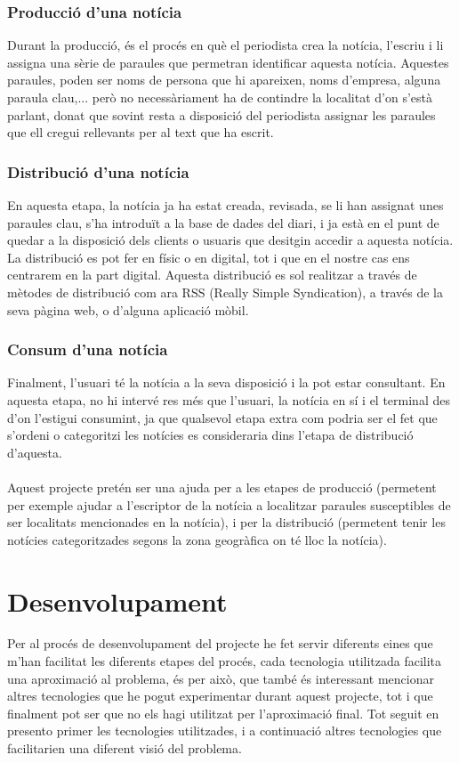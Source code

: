 \documentclass[12pt,a4paper,openright,oneside]{article}
\numberwithin{equation}{section}
\theoremstyle{definition}
\begin{document}
\subsubsection*{Producció d'una notícia}
Durant la producció, és el procés en què el periodista crea la notícia, l'escriu i li assigna una sèrie de paraules que permetran identificar aquesta notícia. Aquestes paraules, poden ser noms de persona que hi apareixen, noms d'empresa, alguna paraula clau,... però no necessàriament ha de contindre la localitat d'on s'està parlant, donat que sovint resta a disposició del periodista assignar les paraules que ell cregui rellevants per al text que ha escrit.\\
\subsubsection*{Distribució d'una notícia}
En aquesta etapa, la notícia ja ha estat creada, revisada, se li han assignat unes paraules clau, s'ha introduït a la base de dades del diari, i ja està en el punt de quedar a la disposició dels clients o usuaris que desitgin accedir a aquesta notícia. La distribució es pot fer en físic o en digital, tot i que en el nostre cas ens centrarem en la part digital. Aquesta distribució es sol realitzar a través de mètodes de distribució com ara RSS (Really Simple Syndication), a través de la seva pàgina web, o d'alguna aplicació mòbil.\\
\subsubsection*{Consum d'una notícia}
Finalment, l'usuari té la notícia a la seva disposició i la pot estar consultant. En aquesta etapa, no hi intervé res més que l'usuari, la notícia en sí i el terminal des d'on l'estigui consumint, ja que qualsevol etapa extra com podria ser el fet que s'ordeni o categoritzi les notícies es consideraria dins l'etapa de distribució d'aquesta.
\\\\
Aquest projecte pretén ser una ajuda per a les etapes de producció (permetent per exemple ajudar a l'escriptor de la notícia a localitzar paraules susceptibles de ser localitats mencionades en la notícia), i per la distribució (permetent tenir les notícies categoritzades segons la zona geogràfica on té lloc la notícia).
\newpage
\section{Desenvolupament}
Per al procés de desenvolupament del projecte he fet servir diferents eines que m'han facilitat les diferents etapes del procés, cada tecnologia utilitzada facilita una aproximació al problema, és per això, que també és interessant mencionar altres tecnologies que he pogut experimentar durant aquest projecte, tot i que finalment pot ser que no els hagi utilitzat per l'aproximació final. Tot seguit en presento primer les tecnologies utilitzades, i a continuació altres tecnologies que facilitarien una diferent visió del problema.
\end{document}
